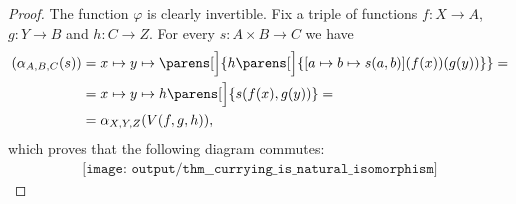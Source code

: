 \begin{proof}
  The function \( \varphi \) is clearly invertible. Fix a triple of functions \( f: X \to A \), \( g: Y \to B \) and \( h: C \to Z \). For every \( s: A \times B \to C \) we have
  \begin{align*}
    [W(f, g, h)](\alpha_{A,B,C}(s))
    &=
    x \mapsto y \mapsto \parens[\Big]{ h\parens[\Big]{ [a \mapsto b \mapsto s(a, b)](f(x))(g(y)) } }
    = \\ &=
    x \mapsto y \mapsto h\parens[\Big]{ s(f(x), g(y)) }
    = \\ &=
    \alpha_{X,Y,Z}(V(f, g, h)),
  \end{align*}
  which proves that the following diagram commutes:
  \begin{equation}\label{eq:thm:currying_is_natural_isomorphism/diagram}
    \begin{aligned}
      \texttt{[image: output/thm\_\_currying\_is\_natural\_isomorphism]}
    \end{aligned}
  \end{equation}
\end{proof}
